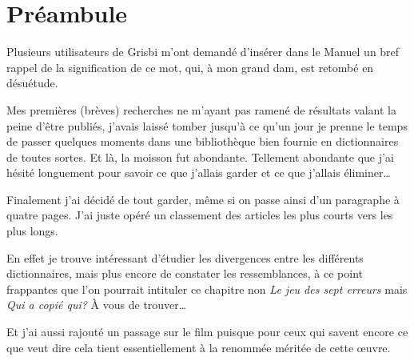 

\chapter{Préambule\label{preamble}}


Plusieurs utilisateurs de \gls{Grisbi} m'ont demandé d'insérer dans le Manuel un bref
rappel de la signification de ce mot, qui, à mon grand dam, est retombé en
désuétude.

Mes premières (brèves) recherches ne m'ayant pas ramené de résultats valant la peine d'\^etre publiés, j'avais laissé tomber jusqu'à ce qu'un jour je prenne le temps de passer quelques moments dans une bibliothèque bien fournie en dictionnaires de toutes sortes. Et là, la moisson fut abondante. Tellement abondante que j'ai hésité longuement pour savoir ce que j'allais garder et ce que j'allais éliminer\ldots

Finalement j'ai décidé de tout garder, m\^eme si on passe ainsi d'un paragraphe à quatre pages. J'ai juste opéré un classement des articles les plus courts vers les plus longs.

En effet je trouve intéressant d'étudier les divergences entre les différents
dictionnaires, mais plus encore de constater les ressemblances, à ce point
frappantes que l'on pourrait intituler ce chapitre non \emph{Le jeu des sept
erreurs} mais \emph{Qui a copié qui?} À vous de trouver\dots

Et j'ai aussi rajouté un passage sur le film puisque pour ceux qui savent encore
ce que  veut dire cela tient essentiellement à la renommée méritée de cette \oe uvre.


